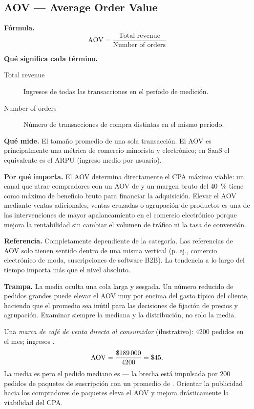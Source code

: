 \subsection{AOV --- Average Order Value}

\textbf{Fórmula.}
\[
  \mathrm{AOV} = \frac{\text{Total revenue}}{\text{Number of orders}}
\]

\textbf{Qué significa cada término.}
\begin{description}
  \item[Total revenue] Ingresos de todas las transacciones en el período de medición.
  \item[Number of orders] Número de transacciones de compra distintas en el mismo período.
\end{description}

\textbf{Qué mide.} El tamaño promedio de una sola transacción. El AOV es principalmente una
métrica de comercio minorista y electrónico; en SaaS el equivalente es el ARPU (ingreso
medio por usuario).

\textbf{Por qué importa.} El AOV determina directamente el CPA máximo viable: un canal que
atrae compradores con un AOV de  y un margen bruto del \qty{40}{\percent} tiene
como máximo  de beneficio bruto para financiar la adquisición. Elevar el AOV
mediante ventas adicionales, ventas cruzadas o agrupación de productos es una de las
intervenciones de mayor apalancamiento en el comercio electrónico porque mejora la
rentabilidad sin cambiar el volumen de tráfico ni la tasa de conversión.

\textbf{Referencia.} Completamente dependiente de la categoría. Las referencias de AOV solo
tienen sentido dentro de una misma vertical (p. ej., comercio electrónico de moda,
suscripciones de software B2B). La tendencia a lo largo del tiempo importa más que el nivel
absoluto.

\textbf{Trampa.} La media oculta una cola larga y sesgada. Un número reducido de pedidos
grandes puede elevar el AOV muy por encima del gasto típico del cliente, haciendo que el
promedio sea inútil para las decisiones de fijación de precios y agrupación. Examinar siempre
la mediana y la distribución, no solo la media.

\begin{example}
Una \textit{marca de café de venta directa al consumidor} (ilustrativo): \num{4200} pedidos
en el mes; ingresos .
\[
  \mathrm{AOV} = \frac{\$\num{189000}}{4200} = \$\num{45}.
\]
La media es  pero el pedido mediano es  --- la brecha está impulsada por
200 pedidos de paquetes de suscripción con un promedio de . Orientar la
publicidad hacia los compradores de paquetes eleva el AOV y mejora drásticamente la
viabilidad del CPA.
\end{example}


